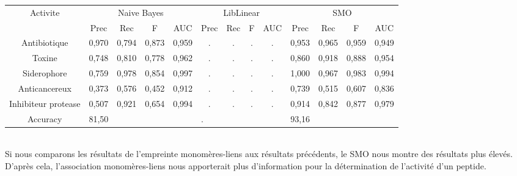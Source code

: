 \documentclass[a4paper,10pt]{report}
\begin{document}
	  \begin{flushleft}
	    \leftskip -3cm
	    \begin{tabular}{|c||c|c|c|c||c|c|c|c||c|c|c|c|}\hline
	      {Activite} & \multicolumn{4}{c||}{Naive Bayes} & \multicolumn{4}{c||}{LibLinear} & \multicolumn{4}{c|}{SMO} \\\cline{2-13}
	      & Prec & Rec & F & AUC & Prec & Rec & F & AUC & Prec & Rec & F & AUC \\\hline
	      Antibiotique & 0,970 & 0,794 & 0,873 & 0,959 & . & . & . & . & 0,953 & 0,965 & 0,959 & 0,949 \\\hline
	      Toxine & 0,748 & 0,810 & 0,778 & 0,962 & . & . & . & . & 0,860 & 0,918 & 0,888 & 0,954 \\\hline
	      Siderophore & 0,759 & 0,978 & 0,854 & 0,997 & . & . & . & . & 1,000 & 0,967 & 0,983 & 0,994  \\\hline
	      Anticancereux & 0,373 & 0,576 & 0,452 & 0,912 & . & . & . & . & 0,739 & 0,515 & 0,607 & 0,836  \\\hline
	      Inhibiteur protease & 0,507 & 0,921 & 0,654 & 0,994 & . & . & . & . & 0,914 & 0,842 & 0,877 & 0,979 \\\hline
	      Accuracy & \multicolumn{4}{l||}{81,50} & \multicolumn{4}{l||}{.} & \multicolumn{4}{l|}{93,16} \\\hline
	    \end{tabular}
	     \label{table 3}
	  \end{flushleft}
	  
	  \\ Si nous comparons les résultats de l'empreinte monomères-liens aux résultats précédents, le SMO nous montre des résultats plus élevés. 
	  D'après cela, l'association monomères-liens nous apporterait plus d'information pour la détermination de l'activité d'un peptide.
\end{document}
